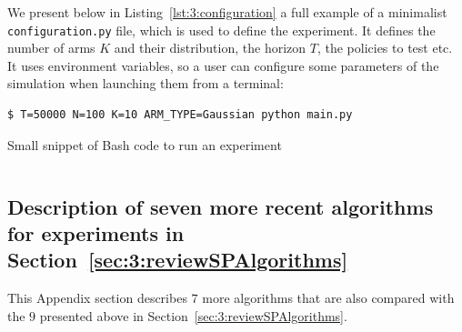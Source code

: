 We present below in Listing~\ref{lst:3:configuration} a full example of a minimalist \texttt{configuration.py} file,
which is used to define the experiment.
It defines the number of arms $K$ and their distribution, the horizon $T$, the policies to test etc.
It uses environment variables, so a user can configure some parameters of the simulation when launching them from a terminal:


\begin{listing}[h!]
    \begin{verbatim}
$ T=50000 N=100 K=10 ARM_TYPE=Gaussian python main.py
    \end{verbatim}
    \caption{Small snippet of Bash code to run an experiment}
    \label{lst:3:howToRunExperiment2}
\end{listing}

\begin{small}
    \inputminted[linenos=true,numbersep=5pt,frame=lines,framesep=2mm]{python3}{2-Chapters/3-Chapter/src/example_of_configuration_singleplayer.py}
\end{small}


\subsection{Description of seven more recent algorithms for experiments in Section~\ref{sec:3:reviewSPAlgorithms}}
\label{sub:3:additionalExperiments}

This Appendix section describes $7$ more algorithms that are also compared with the $9$ presented above in Section~\ref{sec:3:reviewSPAlgorithms}.

